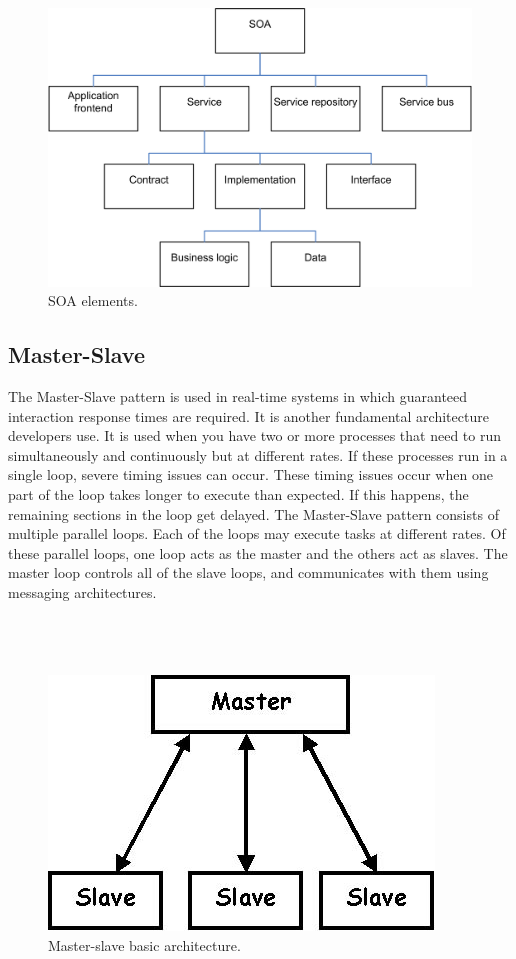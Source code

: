 \documentclass{article}
\begin{document}
\begin{figure}[h]
\centering
\includegraphics[scale=1]{soa.png}
\caption{SOA elements.}
\label{fig_soa}
\end{figure}
	


\subsection{Master-Slave}
The Master-Slave pattern is used in real-time systems in which guaranteed interaction response times are required. It is another fundamental architecture developers use. It is used when you have two or more processes that need to run simultaneously and continuously but at different rates. If these processes run in a single loop, severe timing issues can occur. These timing issues occur when one part of the loop takes longer to execute than expected. If this happens, the remaining sections in the loop get delayed. The Master-Slave pattern consists of multiple parallel loops. Each of the loops may execute tasks at different rates. Of these parallel loops, one loop acts as the master and the others act as slaves. The master loop controls all of the slave loops, and communicates with them using messaging architectures. \\\\\\\\


\begin{figure}[h]
\centering
\includegraphics[scale=0.7]{ms.jpg}
\caption{Master-slave basic architecture.}
\label{fig_ms}
\end{figure}
\newpage
\end{document}
